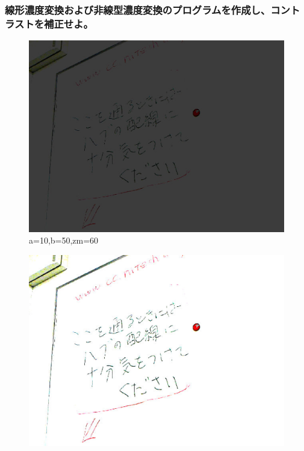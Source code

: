 ﻿\documentclass[a4j,11pt]{jarticle}
\begin{document}
\subsubsection{線形濃度変換および非線型濃度変換のプログラムを作成し、コントラストを補正せよ。}
\clearpage
\begin{figure}[tb]

 \begin{minipage}{0.49\hsize} %
   \center
   \includegraphics[width=\hsize]{./eps/contrast-linear-lowlow.eps}
   \\a=10,b=50,zm=60
 \end{minipage}
 \begin{minipage}{0.49\hsize} %
   \center
   \includegraphics[width=\hsize]{./eps/contrast-linear-lowhigh.eps}

\end{minipage}
\end{figure}
\end{document}
